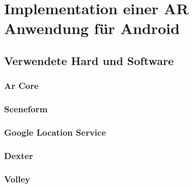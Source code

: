 \chapter{Implementation einer AR Anwendung für Android}

\section{Verwendete Hard und Software}

\subsection{Ar Core}

\subsection{Sceneform}

\subsection{Google Location Service}

\subsection{Dexter}

\subsection{Volley}



